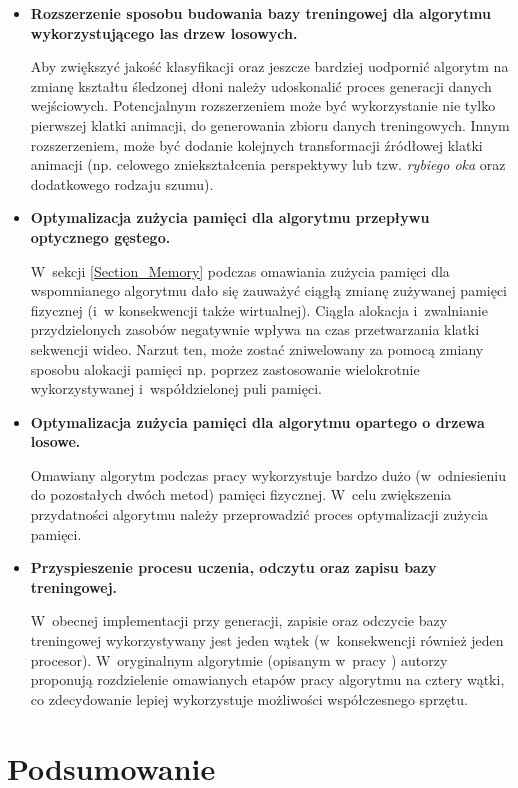   \begin{itemize}
    \item \textbf{Rozszerzenie sposobu budowania bazy treningowej dla algorytmu wykorzystującego las drzew losowych.}

    Aby zwiększyć jakość klasyfikacji oraz jeszcze bardziej uodpornić algorytm na zmianę kształtu śledzonej dłoni należy udoskonalić proces generacji danych wejściowych. Potencjalnym rozszerzeniem może być wykorzystanie nie tylko pierwszej klatki animacji, do generowania zbioru danych treningowych. Innym rozszerzeniem, może być dodanie kolejnych transformacji źródłowej klatki animacji (np. celowego zniekształcenia perspektywy lub tzw. \textit{rybiego oka} oraz dodatkowego rodzaju szumu).

    \item \textbf{Optymalizacja zużycia pamięci dla algorytmu przepływu optycznego gęstego.}

    W~sekcji \ref{Section_Memory} podczas omawiania zużycia pamięci dla wspomnianego algorytmu dało się zauważyć ciągłą zmianę zużywanej pamięci fizycznej (i~w konsekwencji także wirtualnej). Ciągla alokacja i~zwalnianie przydzielonych zasobów negatywnie wpływa na czas przetwarzania klatki sekwencji wideo. Narzut ten, może zostać zniwelowany za pomocą zmiany sposobu alokacji pamięci np. poprzez zastosowanie wielokrotnie wykorzystywanej i~współdzielonej puli pamięci.

    \item \textbf{Optymalizacja zużycia pamięci dla algorytmu opartego o drzewa losowe.}

    Omawiany algorytm podczas pracy wykorzystuje bardzo dużo (w~odniesieniu do pozostałych dwóch metod) pamięci fizycznej. W~celu zwiększenia przydatności algorytmu należy przeprowadzić proces optymalizacji zużycia pamięci.

    \item \textbf{Przyspieszenie procesu uczenia, odczytu oraz zapisu bazy treningowej.}

     W~obecnej implementacji przy generacji, zapisie oraz odczycie bazy treningowej wykorzystywany jest jeden wątek (w~konsekwencji również jeden procesor). W~oryginalnym algorytmie (opisanym w~pracy \cite{RandomizedTrees06}) autorzy proponują rozdzielenie omawianych etapów pracy algorytmu na cztery wątki, co zdecydowanie lepiej wykorzystuje możliwości współczesnego sprzętu.
  \end{itemize}

\chapter{Podsumowanie}\label{Section_Podsumowanie}